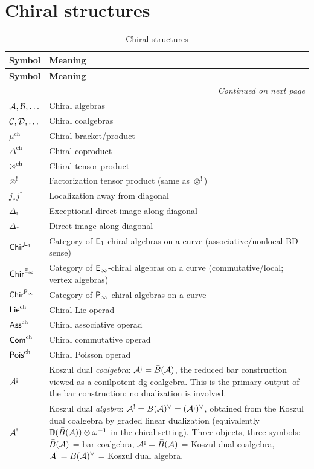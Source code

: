 \section{Chiral structures}
\label{sec:notation-chiral}

\begin{longtable}{p{3cm} p{10cm}}
\caption{Chiral structures} \\
\toprule
\textbf{Symbol} & \textbf{Meaning} \\
\midrule
\endfirsthead
\toprule
\textbf{Symbol} & \textbf{Meaning} \\
\midrule
\endhead
\midrule
\multicolumn{2}{r}{\textit{Continued on next page}} \\
\endfoot
\bottomrule
\endlastfoot

$\mathcal{A}, \mathcal{B}, \ldots$ & Chiral algebras \\
$\mathcal{C}, \mathcal{D}, \ldots$ & Chiral coalgebras \\
$\mu^{\mathrm{ch}}$ & Chiral bracket/product \\
$\Delta^{\mathrm{ch}}$ & Chiral coproduct \\
$\otimes^{\mathrm{ch}}$ & Chiral tensor product \\
$\otimes^{!}$ & Factorization tensor product (same as $\otimes^!$) \\
$j_* j^*$ & Localization away from diagonal \\
$\Delta_!$ & Exceptional direct image along diagonal \\
$\Delta_*$ & Direct image along diagonal \\
$\mathsf{Chir}^{\mathsf{E}_1}$ & Category of $\mathsf{E}_1$-chiral algebras on a curve (associative/nonlocal BD sense) \\
$\mathsf{Chir}^{\mathsf{E}_{\infty}}$ & Category of $\mathsf{E}_{\infty}$-chiral algebras on a curve (commutative/local; vertex algebras) \\
$\mathsf{Chir}^{\mathsf{P}_{\infty}}$ & Category of $\mathsf{P}_{\infty}$-chiral algebras on a curve \\
$\mathsf{Lie}^{\mathrm{ch}}$ & Chiral Lie operad \\
$\mathsf{Ass}^{\mathrm{ch}}$ & Chiral associative operad \\
$\mathsf{Com}^{\mathrm{ch}}$ & Chiral commutative operad \\
$\mathsf{Pois}^{\mathrm{ch}}$ & Chiral Poisson operad \\
$\cA^{\text{\textexclamdown}}$ & Koszul dual \emph{coalgebra}: $\cA^{\text{\textexclamdown}} = \Bbar(\cA)$, the reduced bar construction viewed as a conilpotent dg coalgebra.  This is the primary output of the bar construction; no dualization is involved. \\
$\mathcal{A}^!$ & Koszul dual \emph{algebra}: $\cA^! = \Bbar(\cA)^{\vee} = (\cA^{\text{\textexclamdown}})^\vee$, obtained from the Koszul dual coalgebra by graded linear dualization (equivalently $\mathbb{D}(\bar{B}(\mathcal{A})) \otimes \omega^{-1}$ in the chiral setting).  Three objects, three symbols: $\bar{B}(\mathcal{A})$ = bar coalgebra, $\cA^{\text{\textexclamdown}} = \Bbar(\cA)$ = Koszul dual coalgebra, $\mathcal{A}^! = \bar{B}(\mathcal{A})^\vee$ = Koszul dual algebra. \\

\end{longtable}
